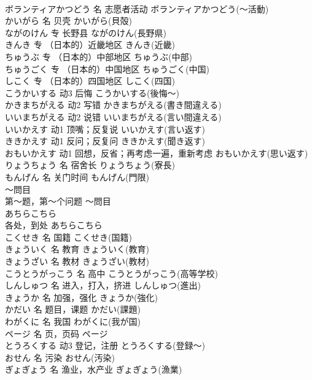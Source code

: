 \documentclass[8pt]{extreport}
\begin{document}
\begin{CJK}{UTF8}{min}
\\	ボランティアかつどう	名	志愿者活动	ボランティアかつどう(～活動)	
\\	かいがら	名	贝壳	かいがら(貝殻)	
\\	ながのけん	专	长野县	ながのけん(長野県)	
\\	きんき	专	（日本的）近畿地区	きんき(近畿)	
\\	ちゅうぶ	专	（日本的）中部地区	ちゅうぶ(中部)	
\\	ちゅうごく	专	（日本的）中国地区	ちゅうごく(中国)	
\\	しこく	专	（日本的）四国地区	しこく(四国)	
\\	こうかいする	动3	后悔	こうかいする(後悔～)	
\\	かきまちがえる	动2	写错	かきまちがえる(書き間違える)	
\\	いいまちがえる	动2	说错	いいまちがえる(言い間違える)	
\\	いいかえす	动1	顶嘴；反复说	いいかえす(言い返す)	
\\	ききかえす	动1	反问；反复问	ききかえす(聞き返す)	
\\	おもいかえす	动1	回想，反省；再考虑一遍，重新考虑	おもいかえす(思い返す)	
\\	りょうちょう	名	宿舍长	りょうちょう(寮長)	
\\	もんげん	名	关门时间	もんげん(門限)	
\\	～問目	
\\	第～题，第～个问题	～問目	
\\	あちらこちら	
\\	各处，到处	あちらこちら	
\\	こくせき	名	国籍	こくせき(国籍)	
\\	きょういく	名	教育	きょういく(教育)	
\\	きょうざい	名	教材	きょうざい(教材)	
\\	こうとうがっこう	名	高中	こうとうがっこう(高等学校)	
\\	しんしゅつ	名	进入，打入，挤进	しんしゅつ(進出)	
\\	きょうか	名	加强，强化	きょうか(強化)	
\\	かだい	名	题目，课题	かだい(課題)	
\\	わがくに	名	我国	わがくに(我が国)	
\\	ページ	名	页，页码	ページ	
\\	とうろくする	动3	登记，注册	とうろくする(登録～)	
\\	おせん	名	污染	おせん(汚染)	
\\	ぎょぎょう	名	渔业，水产业	ぎょぎょう(漁業)	

\end{CJK}
\end{document}
